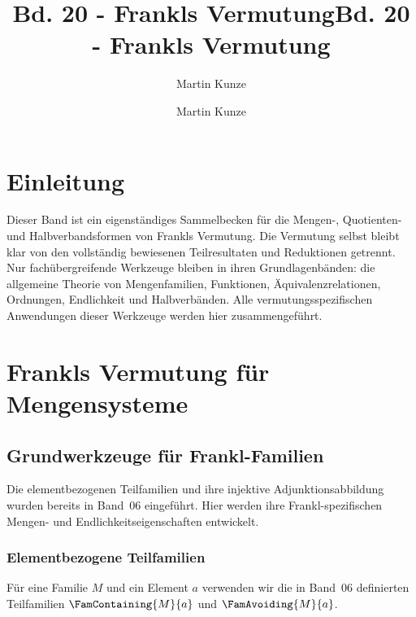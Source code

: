 \documentclass[main.tex]{subfiles}
\title{Bd. 20 - Frankls Vermutung}
\author{Martin Kunze}
\date{}
\begin{document}
\title{Bd. 20 - Frankls Vermutung}
\author{Martin Kunze}
\date{}
\hypersetup{pageanchor=false}
\maketitle
\hypersetup{pageanchor=true}
\setcounter{tocdepth}{3}
\tableofcontents
\setcounter{file}{20}
\renewcommand{\FormulaBandID}{20}
\newcommand{\ProofRefStack}[1]{%
  \ensuremath{\begin{gathered}#1\end{gathered}}}

\chapter{Einleitung}

Dieser Band ist ein eigenständiges Sammelbecken für die Mengen-, Quotienten-
und Halbverbandsformen von Frankls Vermutung. Die Vermutung selbst bleibt
klar von den vollständig bewiesenen Teilresultaten und Reduktionen getrennt.
Nur fachübergreifende Werkzeuge bleiben in ihren Grundlagenbänden: die
allgemeine Theorie von Mengenfamilien, Funktionen, Äquivalenzrelationen,
Ordnungen, Endlichkeit und Halbverbänden. Alle vermutungsspezifischen
Anwendungen dieser Werkzeuge werden hier zusammengeführt.

\chapter{Frankls Vermutung für Mengensysteme}

\section{Grundwerkzeuge für Frankl-Familien}

Die elementbezogenen Teilfamilien und ihre injektive Adjunktionsabbildung
wurden bereits in Band~06 eingeführt. Hier werden ihre
Frankl-spezifischen Mengen- und Endlichkeitseigenschaften entwickelt.

\subsection{Elementbezogene Teilfamilien}

Für eine Familie \(M\) und ein Element \(a\) verwenden wir die in Band~06
definierten Teilfamilien \(\FamContaining{M}{a}\) und
\(\FamAvoiding{M}{a}\).

\begin{tabproof}
\end{tabproof}
\end{document}
